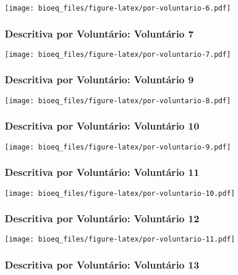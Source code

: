 \documentclass[
]{article}
\begin{document}
\texttt{[image: bioeq\_files/figure-latex/por-voluntario-6.pdf]}

\hypertarget{descritiva-por-voluntuxe1rio-voluntuxe1rio-7}{%
\subsubsection{Descritiva por Voluntário: Voluntário
7}\label{descritiva-por-voluntuxe1rio-voluntuxe1rio-7}}

\texttt{[image: bioeq\_files/figure-latex/por-voluntario-7.pdf]}

\hypertarget{descritiva-por-voluntuxe1rio-voluntuxe1rio-9}{%
\subsubsection{Descritiva por Voluntário: Voluntário
9}\label{descritiva-por-voluntuxe1rio-voluntuxe1rio-9}}

\texttt{[image: bioeq\_files/figure-latex/por-voluntario-8.pdf]}

\hypertarget{descritiva-por-voluntuxe1rio-voluntuxe1rio-10}{%
\subsubsection{Descritiva por Voluntário: Voluntário
10}\label{descritiva-por-voluntuxe1rio-voluntuxe1rio-10}}

\texttt{[image: bioeq\_files/figure-latex/por-voluntario-9.pdf]}

\hypertarget{descritiva-por-voluntuxe1rio-voluntuxe1rio-11}{%
\subsubsection{Descritiva por Voluntário: Voluntário
11}\label{descritiva-por-voluntuxe1rio-voluntuxe1rio-11}}

\texttt{[image: bioeq\_files/figure-latex/por-voluntario-10.pdf]}

\hypertarget{descritiva-por-voluntuxe1rio-voluntuxe1rio-12}{%
\subsubsection{Descritiva por Voluntário: Voluntário
12}\label{descritiva-por-voluntuxe1rio-voluntuxe1rio-12}}

\texttt{[image: bioeq\_files/figure-latex/por-voluntario-11.pdf]}

\hypertarget{descritiva-por-voluntuxe1rio-voluntuxe1rio-13}{%
\subsubsection{Descritiva por Voluntário: Voluntário
13}\label{descritiva-por-voluntuxe1rio-voluntuxe1rio-13}}
\end{document}
